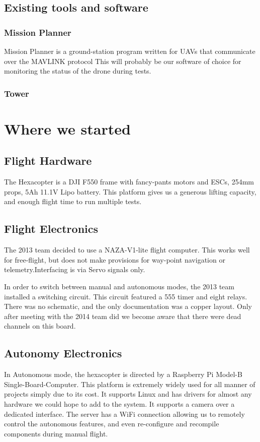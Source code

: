 \documentclass[11pt]{article}
\begin{document}
    \subsection{Existing tools and software}
    \subsubsection{Mission Planner}
      Mission Planner is a ground-station program written for UAVs that communicate over the MAVLINK protocol
      This will probably be our software of choice for monitoring the status of the drone during tests.


    \subsubsection{Tower}




  \section{Where we started}
    \subsection{Flight Hardware}
      The Hexacopter is a DJI F550 frame with fancy-pants motors and ESCs, 254mm props, 5Ah 11.1V Lipo battery.
      This platform gives us a generous lifting capacity, and enough flight time to run multiple tests.

    \subsection{Flight Electronics}
      The 2013 team  decided to use a NAZA-V1-lite flight computer.  This works well for free-flight, but does not make provisions for way-point navigation or telemetry.Interfacing is via Servo signals only.

      In order to switch between manual and autonomous modes, the 2013 team installed a switching circuit. This circuit featured a 555 timer and eight relays.
      There was no schematic, and the only documentation was a copper layout. Only after meeting with the 2014 team did we become aware that there were dead channels on this board.

    \subsection{Autonomy Electronics}
      In Autonomous mode, the hexacopter is directed by a Raspberry Pi Model-B Single-Board-Computer.
      This platform is extremely widely used for all manner of projects simply due to its cost.
      It supports Linux and has drivers for almost any hardware we could hope to add to the system. It supports a camera over a dedicated interface.
      The server has a WiFi connection allowing us to remotely control the autonomous features, and even re-configure and recompile components during manual flight.
\end{document}
